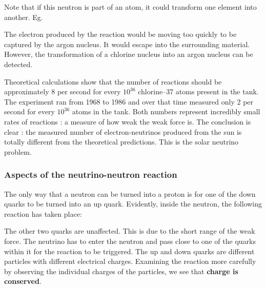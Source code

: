Note that if this neutron is part of an atom, it could transform one element into another. Eg.

The electron produced by the reaction would be moving too quickly to be captured by the argon nucleus. It would escape into the surrounding material. However, the transformation of a chlorine nucleus into an argon nucleus can be detected.

Theoretical calculations show that the number of reactions should be approximately 8 per second for every $10^{36}$ chlorine--37 atoms present in the tank. The experiment ran from 1968 to 1986 and over that time measured only 2 per second for every $10^{36}$ atoms in the tank. Both numbers represent incredibly small rates of reactions : a measure of how weak the weak force is. The conclusion is clear : the measured number of electron-neutrinos produced from the sun is totally different from the theoretical predictions. This is the solar neutrino problem.

\subsubsection{Aspects of the neutrino-neutron reaction}
The only way that a neutron can be turned into a proton is for one of the down quarks to be turned into an up quark. Evidently, inside the neutron, the following reaction has taken place:

The other two quarks are unaffected. This is due to the short range of the weak force. The neutrino has to enter the neutron and pass close to one of the quarks within it for the reaction to be triggered.
The up and down quarks are different particles with different electrical charges. Examining the reaction more carefully by observing the individual charges of the particles, we see that \textbf{charge is conserved}.

